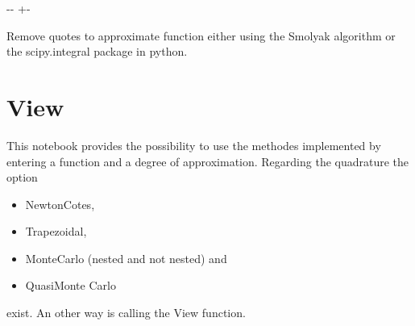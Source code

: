 \documentclass[letterpaper,10pt,english]{sphinxmanual}
\newlength\nbsphinxcodecellspacing
\begin{document}
{

\kern-\sphinxverbatimsmallskipamount\kern-\baselineskip
\kern+\FrameHeightAdjust\kern-\fboxrule
\vspace{\nbsphinxcodecellspacing}

\begin{sphinxVerbatim}[commandchars=\\\{\}]
Remove quotes to approximate function either using the Smolyak algorithm or the scipy.integral package in python.
\end{sphinxVerbatim}
}

{
\begin{sphinxVerbatim}[commandchars=\\\{\}]
\llap{\color{nbsphinxin}[ ]:\,\hspace{\fboxrule}\hspace{\fboxsep}}
\end{sphinxVerbatim}
}


\chapter{View}
\label{\detokenize{examples/View:View}}\label{\detokenize{examples/View::doc}}
This notebook provides the possibility to use the methodes implemented by entering a function and a degree of approximation. Regarding the quadrature the option
\begin{itemize}
\item {} 
Newton\sphinxhyphen{}Cotes,

\item {} 
Trapezoidal,

\item {} 
Monte\sphinxhyphen{}Carlo (nested and not nested) and

\item {} 
Quasi\sphinxhyphen{}Monte Carlo

\end{itemize}

exist. An other way is calling the View function.
\end{document}

